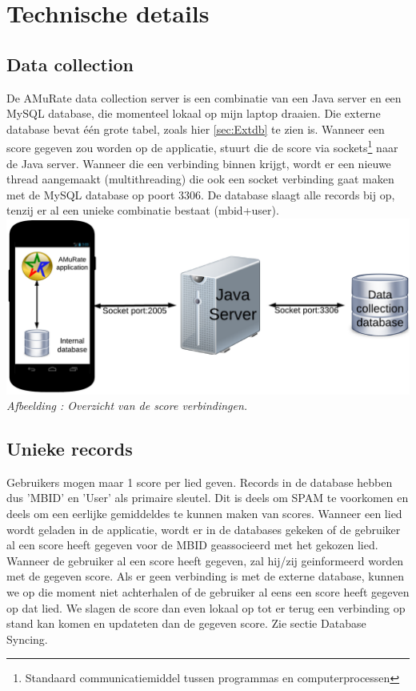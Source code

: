 \documentclass[11pt,a4paper]{article}
\newcounter{figc}
\newcommand{\figID} {%
   \stepcounter{figc}%
   \thefigc}
\begin{document}
	
\newpage %
\section{Technische details}
	\subsection{Data collection}
	De AMuRate data collection server is een combinatie van een Java server en een MySQL database, die momenteel lokaal op mijn laptop draaien. Die externe database bevat één grote tabel, zoals hier \ref{sec:Extdb} te zien is. Wanneer een score gegeven zou worden op de applicatie, stuurt die de score via sockets\footnote{Standaard communicatiemiddel tussen programmas en computerprocessen} naar de Java server. Wanneer die een verbinding binnen krijgt, wordt er een nieuwe thread aangemaakt (multithreading) die ook een socket verbinding gaat maken met de MySQL database op poort 3306. De database slaagt alle records bij op, tenzij er al een unieke combinatie bestaat (mbid+user).
	\includegraphics[scale=1]{Pictures/datacollection.png} \newline
	\small \textit{Afbeelding \figID : Overzicht van de score verbindingen.} \\ \normalsize

	\subsection{Unieke records}
	Gebruikers mogen maar 1 score per lied geven. Records in de database hebben dus 'MBID' en 'User' als primaire sleutel. Dit is deels om SPAM te voorkomen en deels om een eerlijke gemiddeldes te kunnen maken van scores. Wanneer een lied wordt geladen in de applicatie, wordt er in de databases gekeken of de gebruiker al een score heeft gegeven voor de MBID geassocieerd met het gekozen lied. Wanneer de gebruiker al een score heeft gegeven, zal hij/zij geinformeerd worden met de gegeven score. 
	Als er geen verbinding is met de externe database, kunnen we op die moment niet achterhalen of de gebruiker al eens een score heeft gegeven op dat lied. We slagen de score dan even lokaal op tot er terug een verbinding op stand kan komen en updateten dan de gegeven score. Zie sectie Database Syncing.
	
\end{document}
